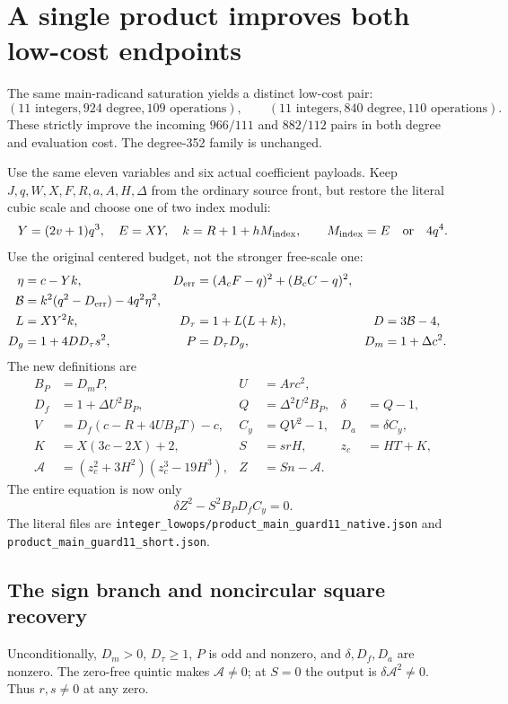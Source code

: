 \section{A single product improves both low-cost endpoints}
The same main-radicand saturation yields a distinct low-cost pair:
\[
 (11\text{ integers},924\text{ degree},109\text{ operations}),\qquad
 (11\text{ integers},840\text{ degree},110\text{ operations}).
\]
These strictly improve the incoming $966/111$ and $882/112$ pairs in
both degree and evaluation cost. The degree-352 family is unchanged.

Use the same eleven variables and six actual coefficient payloads.
Keep $J,q,W,X,F,R,a,A,H,\Delta$ from the ordinary source front, but
restore the literal cubic scale and choose one of two index moduli:
\[
 Y=(2v+1)q^3,\quad E=XY,\quad
 k=R+1+hM_{\rm index},\qquad
 M_{\rm index}=E\quad\hbox{or}\quad4q^4.
\]
Use the original centered budget, not the stronger free-scale one:
\begin{align*}
 \eta&=c-Yk,&D_{\rm err}&=(A_cF-q)^2+(B_cC-q)^2,\\
 \mathcal B&=k^2(q^2-D_{\rm err})-4q^2\eta^2,\\
 L&=XY^2k,&D_\tau&=1+L(L+k),&D&=3\mathcal B-4,\\
 D_g&=1+4DD_\tau s^2,&P&=D_\tau D_g,&D_m&=1+\Delta c^2.
\end{align*}
The new definitions are
\begin{align*}
 B_P&=D_mP,&U&=Arc^2,\\
 D_f&=1+\Delta U^2B_P,&Q&=\Delta^2U^2B_P,&\delta&=Q-1,\\
 V&=D_f(c-R+4UB_PT)-c,&C_y&=QV^2-1,&D_a&=\delta C_y,\\
 K&=X(3c-2X)+2,&S&=srH,&z_c&=HT+K,\\
 \mathcal A&=(z_c^2+3H^2)(z_c^3-19H^3),&Z&=Sn-\mathcal A.
\end{align*}
The entire equation is now only
\begin{equation}\label{eq:lowops-product}
 \boxed{\delta Z^2-S^2B_PD_fC_y=0.}
\end{equation}
The literal files are
\texttt{integer\_lowops/product\_main\_guard11\_native.json} and
\texttt{product\_main\_guard11\_short.json}.

\subsection{The sign branch and noncircular square recovery}
Unconditionally, $D_m>0$, $D_\tau\ge1$, $P$ is odd and nonzero,
and $\delta,D_f,D_a$ are nonzero. The zero-free quintic makes
$\mathcal A\ne0$; at $S=0$ the output is $\delta\mathcal A^2\ne0$.
Thus $r,s\ne0$ at any zero.


